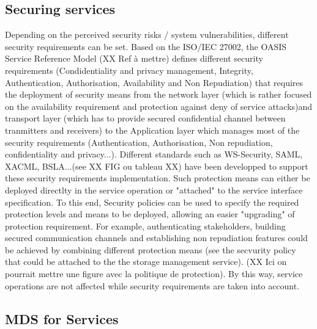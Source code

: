 \documentclass[runningheads,a4paper]{llncs}
\begin{document}
\subsection{Securing services}
Depending on the perceived security risks / system vulnerabilities, different security requirements can be set. Based on the ISO/IEC 27002, the OASIS Service Reference Model (XX Ref \`a mettre) defines different security requirements (Condidentiality and privacy management, Integrity, Authentication, Authorisation, Availability and Non Repudiation) that  requires the deployment of security means from the network layer (which is rather focused on the availability requirement and protection against deny of service attacks)and transport layer (which has to provide secured confidential channel between tranmitters and receivers) to the Application layer which manages most of the security requirements (Authentication, Authorisation, Non repudiation, confidentiality and privacy...). Different standards such as WS-Security, SAML, XACML, BSLA...(see XX FIG ou tableau XX) have been developped to support these security requirements implementation.
Such protection means can either be deployed directlty in the service operation or "attached" to the service interface specification. To this end, Security policies can be used to specify the required protection levels and means to be deployed, allowing an easier "upgrading" of protection requirement. 
For example, authenticating stakeholders, building secured communication channels and establishing non repudiation features could be achieved by combining different protection means (see the secvurity policy that could be attached to the the storage management service). (XX Ici on pourrait mettre une figure avec la politique de protection). By this way, service operations are not affected while security requirements are taken into account.

\subsection{MDS for Services}
\end{document}
